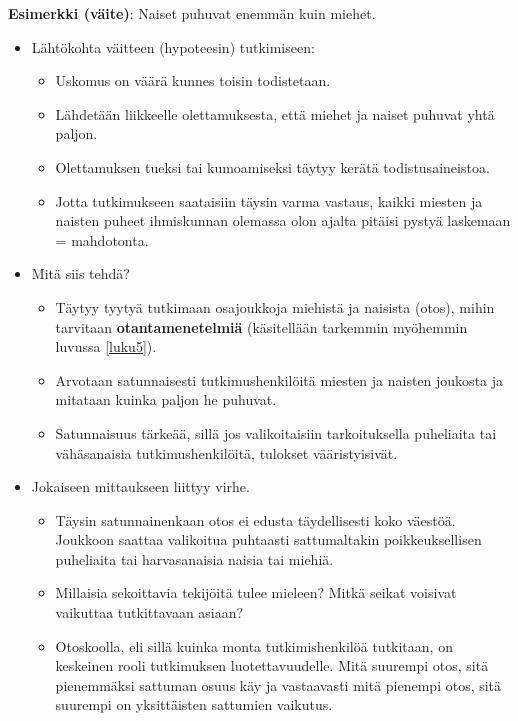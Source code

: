 \documentclass[
]{book}
\providecommand{\tightlist}{%
  \setlength{\itemsep}{0pt}\setlength{\parskip}{0pt}}
\begin{document}
\begin{eblock}{}

\textbf{Esimerkki (väite)}: Naiset puhuvat enemmän kuin miehet.

\begin{itemize}
\tightlist
\item
  Lähtökohta väitteen (hypoteesin) tutkimiseen:

  \begin{itemize}
  \tightlist
  \item
    Uskomus on väärä kunnes toisin todistetaan.
  \item
    Lähdetään liikkeelle olettamuksesta, että miehet ja naiset puhuvat yhtä paljon.
  \item
    Olettamuksen tueksi tai kumoamiseksi täytyy kerätä todistusaineistoa.
  \item
    Jotta tutkimukseen saataisiin täysin varma vastaus, kaikki miesten ja naisten puheet ihmiskunnan olemassa olon ajalta pitäisi pystyä laskemaan = mahdotonta.
  \end{itemize}
\item
  Mitä siis tehdä?

  \begin{itemize}
  \tightlist
  \item
    Täytyy tyytyä tutkimaan osajoukkoja miehistä ja naisista (otos), mihin tarvitaan \textbf{otantamenetelmiä} (käsitellään tarkemmin myöhemmin luvussa \ref{luku5}).
  \item
    Arvotaan satunnaisesti tutkimushenkilöitä miesten ja naisten joukosta ja mitataan kuinka paljon he puhuvat.
  \item
    Satunnaisuus tärkeää, sillä jos valikoitaisiin tarkoituksella puheliaita tai vähäsanaisia tutkimushenkilöitä, tulokset vääristyisivät.
  \end{itemize}
\item
  Jokaiseen mittaukseen liittyy virhe.

  \begin{itemize}
  \tightlist
  \item
    Täysin satunnainenkaan otos ei edusta täydellisesti koko väestöä. Joukkoon saattaa valikoitua puhtaasti sattumaltakin poikkeuksellisen puheliaita tai harvasanaisia naisia tai miehiä.
  \item
    Millaisia sekoittavia tekijöitä tulee mieleen? Mitkä seikat voisivat vaikuttaa tutkittavaan asiaan?
  \item
    Otoskoolla, eli sillä kuinka monta tutkimishenkilöä tutkitaan, on keskeinen rooli tutkimuksen luotettavuudelle. Mitä suurempi otos, sitä pienemmäksi sattuman osuus käy ja vastaavasti mitä pienempi otos, sitä suurempi on yksittäisten sattumien vaikutus.


\end{itemize}
\end{itemize}
\end{eblock}
\end{document}
